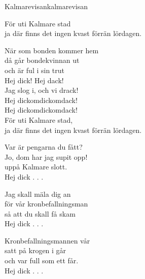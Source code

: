 \begin{song}{Kalmarevisan}{kalmarevisan}
\begin{vers}
För uti Kalmare stad\\
ja där finns det ingen kvast förrän lördagen.\\
\end{vers}
\begin{vers}
\repopen När som bonden kommer hem\\
då går bondekvinnan ut \repclose\\
och är ful i sin trut\\
Hej dick! Hej dack!\\
Jag slog i, och vi drack!\\
Hej dickomdickomdack!\\
Hej dickomdickomdack!\\
För uti Kalmare stad,\\
ja där finns det ingen kvast förrän lördagen.\\
\end{vers}
\begin{vers}
\repopen Var är pengarna du fått?\\
Jo, dom har jag supit opp! \repclose\\
uppå Kalmare slott.\\
Hej dick . . .\\
\end{vers}
\begin{vers}
\repopen Jag skall mäla dig an\\
för vår kronbefallningsman \repclose\\
så att du skall få skam\\
Hej dick . . .\\
\end{vers}
\begin{vers}
\repopen Kronbefallningsmannen vår\\
satt på krogen i går \repclose\\
och var full som ett får.\\
Hej dick . . .\\
\end{vers}
\end{song}
